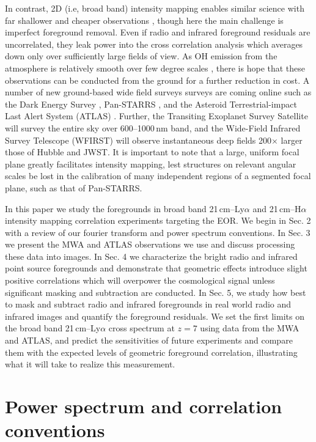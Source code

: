 \documentclass[numberedappendix]{emulateapj}
\begin{document}
In contrast, 2D (i.e, broad band) intensity mapping enables similar science with far shallower and cheaper observations \citep{StarsAndReionization,mao14}, though here the main challenge is imperfect foreground removal. Even if radio and infrared foreground residuals are uncorrelated, they leak power into the cross correlation analysis which averages down only over sufficiently large fields of view. As OH emission from the atmosphere is relatively smooth over few degree scales \citep{high10}, there is hope that these observations can be conducted from the ground for a further reduction in cost. A number of new ground-based wide field surveys surveys are coming online such as the Dark Energy Survey \citep{des16}, Pan-STARRS \citep{tonry12}, and the Asteroid Terrestrial-impact Last Alert System (ATLAS) \citep{tonry11}. Further, the Transiting Exoplanet Survey Satellite \citep{ricker14} will survey the entire sky over 600--1000\,nm band, and the Wide-Field Infrared Survey Telescope (WFIRST) \citep{Spergel2013} will observe instantaneous deep fields 200$\times$ larger those of Hubble and JWST. It is important to note that a large, uniform focal plane greatly facilitates intensity mapping, lest structures on relevant angular scales be lost in the calibration of many independent regions of a segmented focal plane, such as that of Pan-STARRS. 

In this paper we study the foregrounds in broad band 21\,cm--Ly$\alpha$ and 21\,cm--H$\alpha$ intensity mapping correlation experiments targeting the EOR. We begin in Sec. 2 with a review of our fourier transform and power spectrum conventions.
  In Sec. 3 we present the MWA and ATLAS observations we use and discuss processing these data into images. 
   In Sec. 4 we characterize the bright radio and infrared point source foregrounds and 
   demonstrate that geometric effects introduce slight positive correlations which will overpower the cosmological signal
   unless significant masking and subtraction are conducted. 
   In Sec. 5, we study how best to mask and subtract radio and infrared foregrounds in real world radio and infrared images and 
   quantify the foreground residuals. We set the first limits 
   on the broad band 21\,cm--Ly$\alpha$ cross spectrum at $z=7$ using data from the MWA
     and ATLAS, and predict the sensitivities of future experiments and compare them with the expected levels of geometric foreground correlation, 
     illustrating what it will take to realize this measurement.

\section{Power spectrum and correlation conventions}
\label{sec:pspecconventions}
\end{document}
